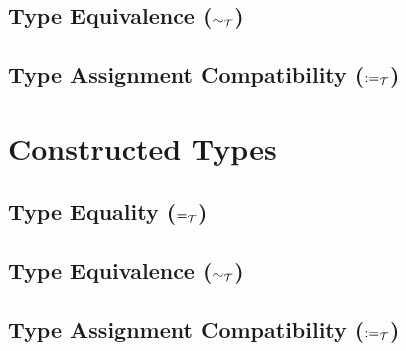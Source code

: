 \documentclass[]{article}
\begin{document}
\subsection{Type Equivalence ($\sim_{\cal T}$)}

\subsection{Type Assignment Compatibility ($:=_{\cal T}$)}

\section{Constructed Types}

\subsection{Type Equality ($=_{\cal T}$)}

\subsection{Type Equivalence ($\sim_{\cal T}$)}

\subsection{Type Assignment Compatibility ($:=_{\cal T}$)}
\end{document}
